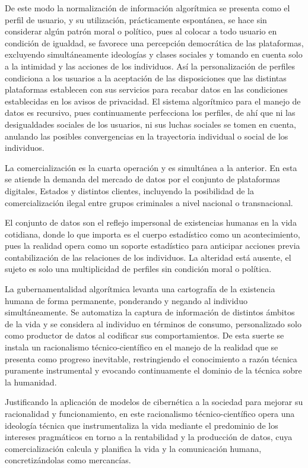 \documentclass[
]{interact}
\begin{document}
De este modo la normalización de información algorítmica se presenta
como el perfil de usuario, y su utilización, prácticamente espontánea,
se hace sin considerar algún patrón moral o político, pues al colocar a
todo usuario en condición de igualdad, se favorece una percepción
democrática de las plataformas, excluyendo simultáneamente ideologías y
clases sociales y tomando en cuenta solo a la intimidad y las acciones
de los individuos. Así la personalización de perfiles condiciona a los
usuarios a la aceptación de las disposiciones que las distintas
plataformas establecen con sus servicios para recabar datos en las
condiciones establecidas en los avisos de privacidad. El sistema
algorítmico para el manejo de datos es recursivo, pues continuamente
perfecciona los perfiles, de ahí que ni las desigualdades sociales de
los usuarios, ni sus luchas sociales se tomen en cuenta, anulando las
posibles convergencias en la trayectoria individual o social de los
individuos.

La comercialización es la cuarta operación y es simultánea a la
anterior. En esta se atiende la demanda del mercado de datos por el
conjunto de plataformas digitales, Estados y distintos clientes,
incluyendo la posibilidad de la comercialización ilegal entre grupos
criminales a nivel nacional o transnacional.

El conjunto de datos son el reflejo impersonal de existencias humanas en
la vida cotidiana, donde lo que importa es el cuerpo estadístico como un
acontecimiento, pues la realidad opera como un soporte estadístico para
anticipar acciones previa contabilización de las relaciones de los
individuos. La alteridad está ausente, el sujeto es solo una
multiplicidad de perfiles sin condición moral o política.

La gubernamentalidad algorítmica levanta una cartografía de la
existencia humana de forma permanente, ponderando y negando al individuo
simultáneamente. Se automatiza la captura de información de distintos
ámbitos de la vida y se considera al individuo en términos de consumo,
personalizado solo como productor de datos al codificar sus
comportamientos. De esta suerte se instala un racionalismo
técnico-científico en el manejo de la realidad que se presenta como
progreso inevitable, restringiendo el conocimiento a razón técnica
puramente instrumental y evocando continuamente el dominio de la técnica
sobre la humanidad.

Justificando la aplicación de modelos de cibernética a la sociedad para
mejorar su racionalidad y funcionamiento, en este racionalismo
técnico-científico opera una ideología técnica que instrumentaliza la
vida mediante el predominio de los intereses pragmáticos en torno a la
rentabilidad y la producción de datos, cuya comercialización calcula y
planifica la vida y la comunicación humana, concretizándolas como
mercancías.
\end{document}
